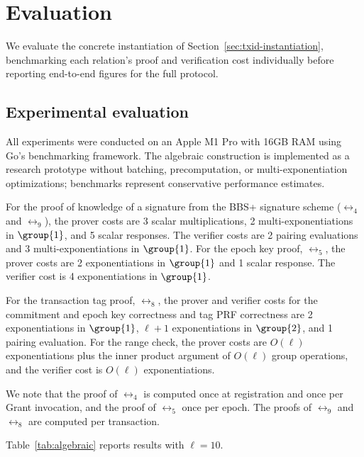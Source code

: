 \section{Evaluation}\label{sec:txid-evaluation}

We evaluate the concrete instantiation of Section~\ref{sec:txid-instantiation},
benchmarking each relation's proof and verification cost individually before
reporting end-to-end figures for the full protocol.

\subsection{Experimental evaluation}\label{sec:txid-eval-experimental}

All experiments were conducted on an Apple M1 Pro with 16GB RAM using Go's
benchmarking framework. The algebraic construction is implemented as a research
prototype without batching, precomputation, or multi-exponentiation
optimizations; benchmarks represent conservative performance estimates.

For the proof of knowledge of a signature from the BBS+ signature scheme
($\rel_4$ and $\rel_9$), the prover costs are 3 scalar multiplications, 2
multi-exponentiations in $\group{1}$, and 5 scalar responses. The verifier
costs are 2 pairing evaluations and 3 multi-exponentiations in $\group{1}$.
For the epoch key proof, $\rel_5$, the prover costs are 2 exponentiations in
$\group{1}$ and 1 scalar response. The verifier cost is 4 exponentiations in
$\group{1}$.

For the transaction tag proof, $\rel_8$, the prover and verifier costs for the
commitment and epoch key correctness and tag PRF correctness are 2
exponentiations in $\group{1}$, $\ell+1$ exponentiations in $\group{2}$, and 1
pairing evaluation. For the range check, the prover costs are $O(\ell)$
exponentiations plus the inner product argument of $O(\ell)$ group operations,
and the verifier cost is $O(\ell)$ exponentiations.

We note that the proof of $\rel_4$ is computed once at registration and once
per Grant invocation, and the proof of $\rel_5$ once per epoch.  The proofs of
$\rel_9$ and $\rel_8$ are computed per transaction.

Table~\ref{tab:algebraic} reports results with $\ell = 10$.

